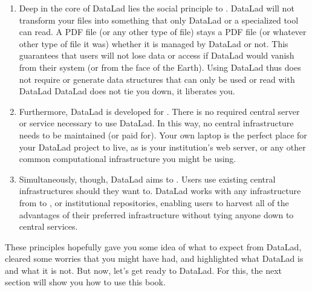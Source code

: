 \begin{enumerate}
\item {} 
\sphinxAtStartPar
Deep in the core of DataLad lies the social principle to
. DataLad will not transform
your files into something that only DataLad or a specialized tool can read.
A PDF file (or any other type of
file) stays a PDF file (or whatever other type of file it was)
whether it is managed by DataLad or not. This guarantees that users will not lose
data or access if DataLad would vanish from their system (or from the face of the
Earth). Using DataLad thus does not require or generate
data structures that can only be used or read with DataLad \textendash{} DataLad does not
tie you down, it liberates you.

\item {} 
\sphinxAtStartPar
Furthermore, DataLad is developed for .
There is no required central server or service necessary to use DataLad. In this
way, no central infrastructure needs to be maintained (or paid for).
Your own laptop is the perfect place for your DataLad project to live, as is your
institution’s web server, or any other common computational infrastructure you
might be using.

\item {} 
\sphinxAtStartPar
Simultaneously, though, DataLad aims to
.
Users  use existing central infrastructures should they want to.
DataLad works with any infrastructure from {\hyperref[\detokenize{glossary:term-GitHub}]{}} to
, 
or institutional repositories,
enabling users to harvest all of the advantages of their preferred
infrastructure without tying anyone down to central services.

\end{enumerate}

\sphinxAtStartPar
These principles hopefully gave you some idea of what to expect from DataLad,
cleared some worries that you might have had, and highlighted what DataLad is and what
it is not.
But now, let’s get ready to  DataLad. For this, the next
section will show you how to use this book.

\sphinxstepscope


